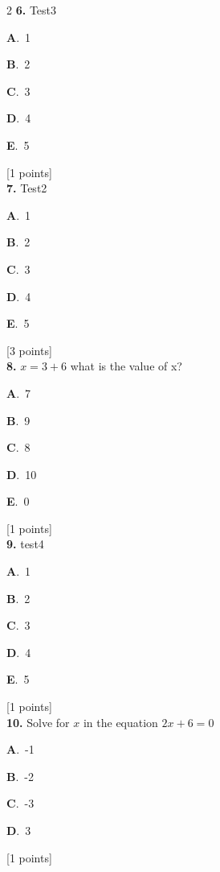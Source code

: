 \documentclass[12pt]{article}
\newcommand{\choice}[3]{%
  \noindent\textbf{#1}.~#2\hfill#3\par\vspace{0.25em}
}
\begin{document}
\begin{multicols}{2}
\noindent \textbf{\textenglish{6.}} {\textenglish{Test3}}

\noindent\choice{A}{{\textenglish{1}}}{}
\noindent\choice{B}{{\textenglish{2}}}{}
\noindent\choice{C}{{\textenglish{3}}}{}
\noindent\choice{D}{{\textenglish{4}}}{}
\noindent\choice{E}{{\textenglish{5}}}{}
\hfill {\textenglish{[1 points]}}\\[0.5em]

\noindent \textbf{\textenglish{7.}} {\textenglish{Test2}}

\noindent\choice{A}{{\textenglish{1}}}{}
\noindent\choice{B}{{\textenglish{2}}}{}
\noindent\choice{C}{{\textenglish{3}}}{}
\noindent\choice{D}{{\textenglish{4}}}{}
\noindent\choice{E}{{\textenglish{5}}}{}
\hfill {\textenglish{[3 points]}}\\[0.5em]

\noindent \textbf{\textenglish{8.}} \(x=3+6 \){\textenglish{ what is the value of x?}}

\noindent\choice{A}{{\textenglish{7}}}{}
\noindent\choice{B}{{\textenglish{9}}}{}
\noindent\choice{C}{{\textenglish{8}}}{}
\noindent\choice{D}{{\textenglish{10}}}{}
\noindent\choice{E}{{\textenglish{0}}}{}
\hfill {\textenglish{[1 points]}}\\[0.5em]

\noindent \textbf{\textenglish{9.}} {\textenglish{test4}}

\noindent\choice{A}{{\textenglish{1}}}{}
\noindent\choice{B}{{\textenglish{2}}}{}
\noindent\choice{C}{{\textenglish{3}}}{}
\noindent\choice{D}{{\textenglish{4}}}{}
\noindent\choice{E}{{\textenglish{5}}}{}
\hfill {\textenglish{[1 points]}}\\[0.5em]

\noindent \textbf{\textenglish{10.}} {\textenglish{Solve for }}\(x \){\textenglish{ in the equation }}\(2x+6 = 0 \)

\noindent\choice{A}{{\textenglish{-1}}}{}
\noindent\choice{B}{{\textenglish{-2}}}{}
\noindent\choice{C}{{\textenglish{-3}}}{}
\noindent\choice{D}{{\textenglish{3}}}{}
\hfill {\textenglish{[1 points]}}\\[0.5em]


\end{multicols}
\end{document}
